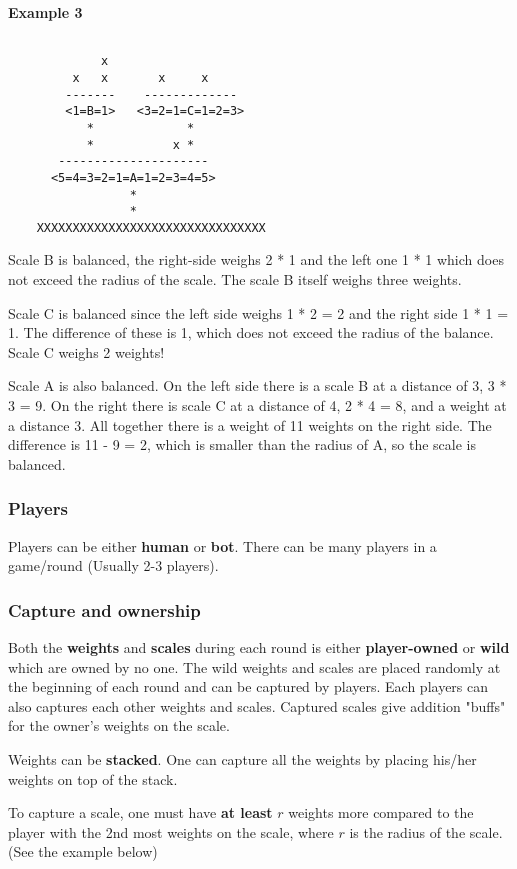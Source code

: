 \documentclass[12pt]{article}
\begin{document}
\textbf{Example 3}

\begin{verbatim}

             x
         x   x       x     x
        -------    -------------
        <1=B=1>   <3=2=1=C=1=2=3>
           *             *
           *           x *
       ---------------------
      <5=4=3=2=1=A=1=2=3=4=5>
                 *
                 *
    XXXXXXXXXXXXXXXXXXXXXXXXXXXXXXXX
\end{verbatim}

Scale B is balanced, the right-side weighs 2 * 1 and the left one 1 * 1 which
does not exceed the radius of the scale. The scale B itself weighs three
weights.

Scale C is balanced since the left side weighs 1 * 2 = 2 and the right side 1 *
1 = 1. The difference of these is 1, which does not exceed the radius of the
balance. Scale C weighs 2 weights!

Scale A is also balanced. On the left side there is a scale B at a distance of
3, 3 * 3 = 9. On the right there is scale C at a distance of 4, 2 * 4 = 8, and a
weight at a distance 3. All together there is a weight of 11 weights on the
right side. The difference is 11 - 9 = 2, which is smaller than the radius of A,
so the scale is balanced.

\subsubsection{Players}
Players can be either \textbf{human} or \textbf{bot}. There can be many players
in a game/round (Usually 2-3 players).

\subsubsection{Capture and ownership}
\label{sec:cap}

Both the \textbf{weights} and \textbf{scales} during each round is either
\textbf{player-owned} or \textbf{wild} which are owned by no one. The wild
weights and scales are placed randomly at the beginning of each round and can be
captured by players. Each players can also captures each other weights and
scales. Captured scales give addition "buffs" for the owner's weights on the
scale.

Weights can be \textbf{stacked}. One can capture all the weights by placing
his/her weights on top of the stack.

To capture a scale, one must have \textbf{at least} $r$ weights more compared to
the player with the 2nd most weights on the scale, where $r$ is the radius of
the scale.  (See the example below)
\end{document}
